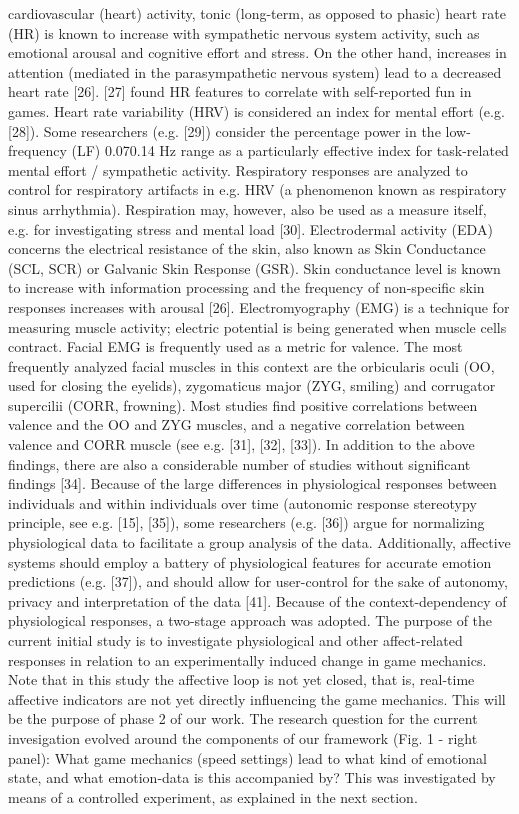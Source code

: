 cardiovascular (heart) activity, tonic (long-term, as opposed to phasic) heart rate (HR) is known to increase with sympathetic nervous system activity, such as emotional arousal and cognitive effort and stress. On the other hand, increases in attention (mediated in the parasympathetic nervous system) lead to a decreased heart rate [26]. [27] found HR features to correlate with self-reported fun in games. Heart rate variability (HRV) is considered an index for mental effort (e.g. [28]). Some researchers (e.g. [29]) consider the percentage power in the low-frequency (LF) 0.070.14 Hz range as a particularly effective index for task-related mental effort / sympathetic activity. Respiratory responses are analyzed to control for respiratory artifacts in e.g. HRV (a phenomenon known as respiratory sinus arrhythmia). Respiration may, however, also be used as a measure itself, e.g. for investigating stress and mental load [30]. Electrodermal activity (EDA) concerns the electrical resistance of the skin, also known as Skin Conductance (SCL, SCR) or Galvanic Skin Response (GSR). Skin conductance level is known to increase with information processing and the frequency of non-specific skin responses increases with arousal [26]. Electromyography (EMG) is a technique for measuring muscle activity; electric potential is being generated when muscle cells contract. Facial EMG is frequently used as a metric for valence. The most frequently analyzed facial muscles in this context are the orbicularis oculi (OO, used for closing the eyelids), zygomaticus major (ZYG, smiling) and corrugator supercilii (CORR, frowning). Most studies find positive correlations between valence and the OO and ZYG muscles, and a negative correlation between valence and CORR muscle (see e.g. [31], [32], [33]). In addition to the above findings, there are also a considerable number of studies without significant findings [34]. Because of the large differences in physiological responses between individuals and within individuals over time (autonomic response stereotypy principle, see e.g. [15], [35]), some researchers (e.g. [36]) argue for normalizing physiological data to facilitate a group analysis of the data. Additionally, affective systems should employ a battery of physiological features for accurate emotion predictions (e.g. [37]), and should allow for user-control for the sake of autonomy, privacy and interpretation of the data [41]. Because of the context-dependency of physiological responses, a two-stage approach was adopted. The purpose of the current initial study is to investigate physiological and other affect-related responses in relation to an experimentally induced change in game mechanics. Note that in this study the affective loop is not yet closed, that is, real-time affective indicators are not yet directly influencing the game mechanics. This will be the purpose of phase 2 of our work. The research question for the current invesigation evolved around the components of our framework (Fig. 1 - right panel): What game mechanics (speed settings) lead to what kind of emotional state, and what emotion-data is this accompanied by? This was investigated by means of a controlled experiment, as explained in the next section.

